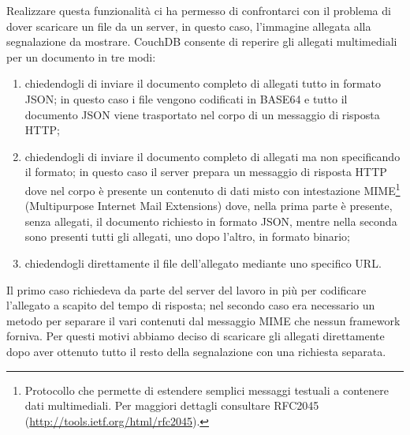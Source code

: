 			
			Realizzare questa funzionalità ci ha permesso di confrontarci con il 
			problema di dover scaricare un file da un server, in questo caso, 
			l'immagine allegata alla segnalazione da mostrare. CouchDB 
			consente di reperire gli allegati multimediali per un documento in 
			tre modi:
			\begin{enumerate}
				\item chiedendogli di inviare il documento completo di allegati 
				tutto in formato JSON; in questo caso i file vengono codificati 
				in BASE64 e tutto il documento JSON viene trasportato nel corpo 
				di un messaggio di risposta HTTP;
				\item chiedendogli di inviare il documento completo di allegati 
				ma non specificando il formato; in questo caso il server prepara 
				un messaggio di risposta HTTP dove nel corpo è presente un 
				contenuto di dati misto con intestazione 
				MIME\footnote{Protocollo che permette di estendere semplici 
				messaggi testuali a contenere dati multimediali. Per maggiori 
				dettagli consultare RFC2045 
				(\url{http://tools.ietf.org/html/rfc2045}).} (Multipurpose 
				Internet Mail Extensions) dove, nella prima parte è presente, 
				senza allegati, il documento richiesto in formato JSON, mentre 
				nella seconda sono presenti tutti gli allegati, uno dopo 
				l'altro, in formato binario;
				\item chiedendogli direttamente il file dell'allegato mediante 
				uno specifico URL.
			\end{enumerate}
			Il primo caso richiedeva da parte del server del lavoro in più per 
			codificare l'allegato a scapito del tempo di risposta; nel secondo 
			caso era necessario un metodo per separare il vari contenuti dal 
			messaggio MIME che nessun framework forniva. Per questi motivi 
			abbiamo deciso di scaricare gli allegati direttamente dopo aver 
			ottenuto tutto il resto della segnalazione con una richiesta 
			separata.
			
